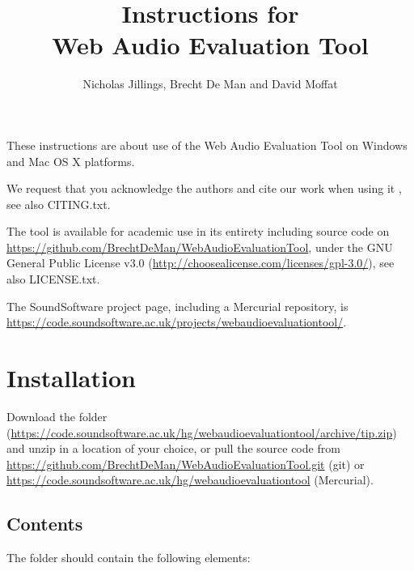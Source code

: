 \documentclass[11pt, oneside]{article}   	%
\title{Instructions for \\ Web Audio Evaluation Tool}
\author{Nicholas Jillings, Brecht De Man and David Moffat}
\begin{document}
\maketitle

These instructions are about use of the Web Audio Evaluation Tool on Windows and Mac OS X platforms. 

We request that you acknowledge the authors and cite our work when using it \cite{waet}, see also CITING.txt. 

The tool is available for academic use in its entirety including source code on \url{https://github.com/BrechtDeMan/WebAudioEvaluationTool}, under the GNU General Public License v3.0 (\url{http://choosealicense.com/licenses/gpl-3.0/}), see also LICENSE.txt. 

The SoundSoftware project page, including a Mercurial repository, is \url{https://code.soundsoftware.ac.uk/projects/webaudioevaluationtool/}. 


\tableofcontents

\clearpage

\section{Installation}
	\label{sec:installation}
	Download the folder (\url{https://code.soundsoftware.ac.uk/hg/webaudioevaluationtool/archive/tip.zip}) and unzip in a location of your choice, or pull the source code from \url{https://github.com/BrechtDeMan/WebAudioEvaluationTool.git} (git) or \url{https://code.soundsoftware.ac.uk/hg/webaudioevaluationtool} (Mercurial). 
	
	\subsection{Contents}
		The folder should contain the following elements: \\
		
\end{document}
